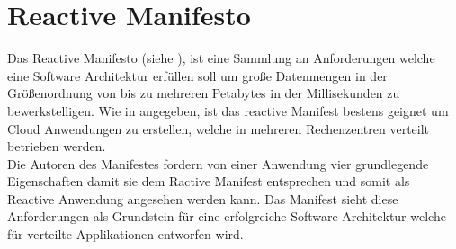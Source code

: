 \section{Reactive Manifesto}
Das {Reactive Manifesto} (siehe \cite{reactiveManifesto}), ist eine Sammlung an Anforderungen welche eine Software Architektur erfüllen soll um große Datenmengen in der Größenordnung von bis zu mehreren Petabytes in der Millisekunden zu bewerkstelligen. 
Wie in \cite{reactiveManifesto} angegeben, ist das {reactive Manifest} bestens geignet um Cloud Anwendungen zu erstellen, welche in mehreren Rechenzentren verteilt betrieben werden. \\
Die Autoren des Manifestes fordern von einer Anwendung vier grundlegende Eigenschaften damit sie dem {Ractive Manifest} entsprechen und somit als {Reactive Anwendung} angesehen werden kann. Das Manifest sieht diese Anforderungen als Grundstein für eine erfolgreiche Software Architektur welche für verteilte Applikationen entworfen wird. 
